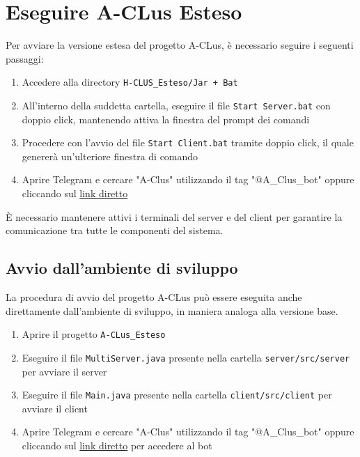
\section{Eseguire A-CLus Esteso}


Per avviare la versione estesa del progetto A-CLus, è necessario seguire i seguenti passaggi:
\begin{enumerate}
    \item Accedere alla directory \texttt{H-CLUS\_Esteso/Jar + Bat}
    \item All'interno della suddetta cartella, eseguire il file \texttt{Start Server.bat} con doppio click, mantenendo attiva la finestra del prompt dei comandi
    \item Procedere con l'avvio del file \texttt{Start Client.bat} tramite doppio click, il quale genererà un'ulteriore finestra di comando
    \item Aprire Telegram e cercare "A-Clus" utilizzando il tag "@A\_Clus\_bot" oppure cliccando sul \href{https://shorturl.at/r07hj}{link diretto}
\end{enumerate}

\begin{tcolorbox}[colback=white, colframe=gray, title=Avvertenza]
    È necessario mantenere attivi i terminali del server e del client per garantire la comunicazione tra tutte le componenti del sistema.
\end{tcolorbox}

\subsection{Avvio dall'ambiente di sviluppo}

La procedura di avvio del progetto A-CLus può essere eseguita anche direttamente dall'ambiente di sviluppo, in maniera analoga alla versione base. 

\begin{enumerate}
    \item Aprire il progetto \texttt{A-CLus\_Esteso}
    \item Eseguire il file \texttt{MultiServer.java} presente nella cartella \texttt{server/src/server} per avviare il server
    \item Eseguire il file \texttt{Main.java} presente nella cartella \texttt{client/src/client} per avviare il client
    \item Aprire Telegram e cercare "A-Clus" utilizzando il tag "@A\_Clus\_bot" oppure cliccando sul \href{https://shorturl.at/r07hj}{link diretto} per accedere al bot 
\end{enumerate}


